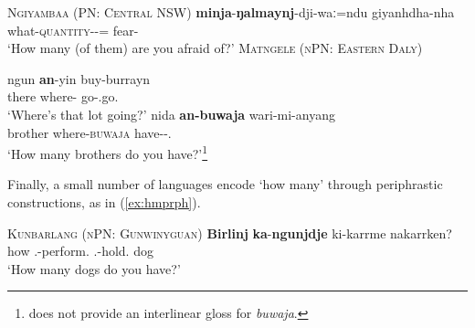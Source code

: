 \documentclass[12pt,egregdoesnotlikesansseriftitles]{scrartcl}
\begin{document}
\begin{exe}
  \ex\label{ex:hmwhatq}\textsc{Ngiyambaa (PN: Central NSW)}\hfill {}
  \gll \textbf{minja}-\textbf{ŋalmaynj}-dji-waː=ndu giyanhdha-nha\\
  what-\textsc{quantity}-\Circ-\Excl=\Second\Nom{} fear-\Prs\\
  \glt `How many (of them) are you afraid of?'
  \ex \label{howmanyex2} \textsc{Matngele (nPN: Eastern Daly)}\hfill {}
  \begin{xlist}
    \ex \gll ngun \textbf{an}-yin buy-burrayn\\
    there where-\All{} go-\Third\Aug\Sbj.go.\Impv\\
    \glt `Where's that lot going?' %
    \ex \gll nida \textbf{an-buwaja} wari-mi-anyang\\
    brother where-\textsc{buwaja} have-\Impv-\Second\Min\Sbj.\Prs\\
    \glt `How many brothers do you have?'\footnote{\cite{zandvoort99} does not provide an interlinear gloss for \textit{buwaja}.} %
  \end{xlist}
  \end{exe}
  
 Finally, a small number of languages encode `how many'  through periphrastic constructions, as in (\ref{ex:hmprph}).
  
  \begin{exe}
  \ex\label{ex:hmprph}\textsc{Kunbarlang (nPN: Gunwinyguan)}\hfill \citep{ikthesis}
  \gll \textbf{Birlinj} \textbf{ka}-\textbf{ngunjdje} ki-karrme nakarrken?\\
  how \Tsg.\Nfut-perform.\Np{} \Ssg.\Nfut-hold.\Np{} dog\\
  \glt `How many dogs do you have?' %
\end{exe}
\end{document}
